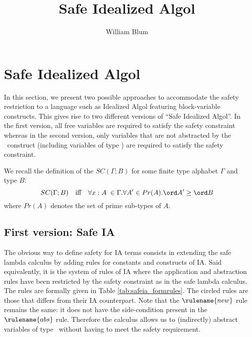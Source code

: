 



\author{William Blum}
\title{Safe Idealized Algol}


\maketitle

\section{Safe Idealized Algol}

In this section, we present two possible approaches to accommodate
the safety restriction to a language such as Idealized Algol
featuring block-variable constructs. This gives rise to two
different versions of ``Safe Idealized Algol''. In the first
version, all free variables are required to satisfy the safety
constraint whereas in the second version, only variables that are
not abstracted by the \ianew\ construct (including variables of type
\iavar) are required to satisfy the safety constraint.

We recall the definition of the  $SC(\Gamma ; B)$
for some finite type alphabet $\Gamma$ and type $B$:
$$SC(\Gamma ; B) \quad \mbox{iff} \quad  \forall x:A\; \in \Gamma . \forall A' \in Pr(A) . \ord A' \geq \ord B$$
where $Pr(A)$ denotes the set of prime sub-types of $A$.



\subsection{First version: Safe IA}

 The obvious way to define safety for IA terms consists in extending the safe lambda calculus by adding rules
 for constants and constructs of IA.
Said equivalently, it is the system of rules of IA where the
application and abstraction rules  have been restricted by the
safety constraint as in the safe lambda calculus. The rules are
formally given in Table \ref{tab:safeia_formrules}. The circled
rules are those that differs from their IA counterpart. Note that
the $\rulename{new}$ rule remains the same: it does not have the
side-condition present in the $\rulename{abs}$ rule. Therefore the
calculus allows us to (indirectly) abstract variables of type
\iavar\ without having to meet the safety requirement.


